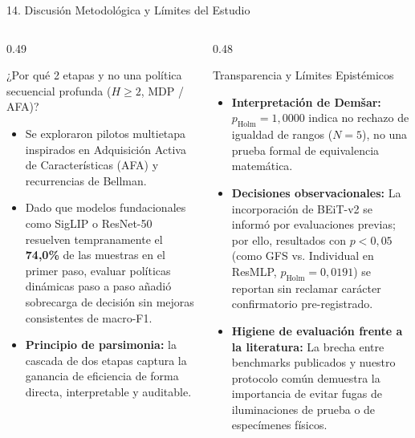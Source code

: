 \documentclass[aspectratio=169,10pt]{beamer}
\begin{document}
\begin{frame}{14. Discusión Metodológica y Límites del Estudio}
\begin{columns}[T]
\begin{column}{0.49\textwidth}
\begin{block}{¿Por qué 2 etapas y no una política secuencial profunda ($H \ge 2$, MDP / AFA)?}
\begin{itemize}
\item Se exploraron pilotos multietapa inspirados en Adquisición Activa de Características (AFA) y recurrencias de Bellman.
\item Dado que modelos fundacionales como SigLIP o ResNet-50 resuelven tempranamente el \textbf{74,0\%} de las muestras en el primer paso, evaluar políticas dinámicas paso a paso añadió sobrecarga de decisión sin mejoras consistentes de macro-F1.
\item \textbf{Principio de parsimonia:} la cascada de dos etapas captura la ganancia de eficiencia de forma directa, interpretable y auditable.
\end{itemize}
\end{block}
\end{column}
\begin{column}{0.48\textwidth}
\begin{alertblock}{Transparencia y Límites Epistémicos}
\begin{itemize}
\item \textbf{Interpretación de Demšar:} $p_{\text{Holm}} = 1{,}0000$ indica no rechazo de igualdad de rangos ($N=5$), no una prueba formal de equivalencia matemática.
\item \textbf{Decisiones observacionales:} La incorporación de BEiT-v2 se informó por evaluaciones previas; por ello, resultados con $p < 0{,}05$ (como GFS vs. Individual en ResMLP, $p_{\text{Holm}} = 0{,}0191$) se reportan sin reclamar carácter confirmatorio pre-registrado.
\item \textbf{Higiene de evaluación frente a la literatura:} La brecha entre benchmarks publicados y nuestro protocolo común demuestra la importancia de evitar fugas de iluminaciones de prueba o de especímenes físicos.
\end{itemize}
\end{alertblock}
\end{column}
\end{columns}
\end{frame}
\end{document}
